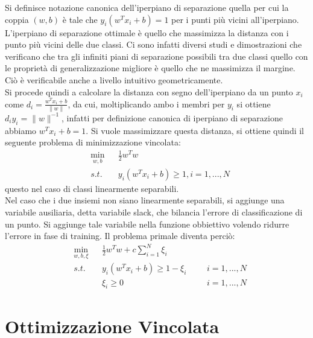 \documentclass{report}
\begin{document}
Si definisce notazione canonica dell'iperpiano di separazione quella per cui la coppia $(w, b)$ è tale che $y_i (w^Tx_i+b) = 1$ per i punti più vicini all'iperpiano.\\
L'iperpiano di separazione ottimale è quello che massimizza la distanza con i punto più vicini delle due classi. Ci sono infatti diversi studi e dimostrazioni che verificano che tra gli infiniti piani di separazione possibili tra due classi quello con le proprietà di generalizzazione migliore è quello che ne massimizza il margine. Ciò è verificabile anche a livello intuitivo geometricamente. \\Si procede quindi a calcolare la distanza con segno dell'iperpiano da un punto $x_i$ come $d_i =\frac{w^T x_i + b}{\|w\|}$, da cui, moltiplicando ambo i membri per $y_i$ si ottiene $d_i y_i = \|w\|^{-1}$, infatti per definizione canonica di iperpiano di separazione abbiamo $w^T x_i + b= 1$. Si vuole massimizzare questa distanza, si ottiene quindi il seguente problema di minimizzazione vincolata:
\begin{equation} 
	\begin{aligned}
	& \min_{w, b} 
	& & \frac{1}{2}w^T w\\
	& s.t. 
	& & y_i (w^Tx_i+b) \geqslant 1 , i= 1,...,N
	\end{aligned}
\end{equation}
questo nel caso di classi linearmente separabili.\\

Nel caso che i due insiemi non siano linearmente separabili, si aggiunge una variabile ausiliaria, detta variabile slack, che bilancia l'errore di classificazione di un punto. Si aggiunge tale variabile nella funzione obbiettivo volendo ridurre l'errore in fase di training. Il problema primale diventa perciò:
\begin{equation} \label{primale}
	\begin{aligned}
	& \min_{w, b, \xi} 
	& & \frac{1}{2}w^T w + c \sum_{i = 1}^{N}{\xi_i}\\
	& s.t. 
	& & y_i (w^Tx_i+b) \geqslant 1 - \xi_i 
	& & & i= 1,...,N\\
	&
	& & \xi_i \geqslant 0
	& & & i= 1,...,N
	\end{aligned}
\end{equation}
\section{Ottimizzazione Vincolata}
\end{document}
